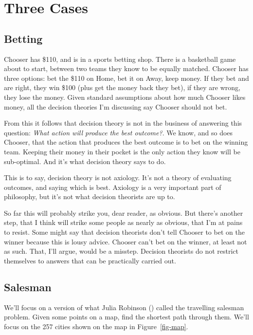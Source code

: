 \documentclass[
  11pt,
  letterpaper,
  DIV=11,
  numbers=noendperiod,
  oneside]{scrartcl}
\begin{document}
\section{Three Cases}\label{three-cases}

\subsection{Betting}\label{betting}

Chooser has \$110, and is in a sports betting shop. There is a
basketball game about to start, between two teams they know to be
equally matched. Chooser has three options: bet the \$110 on Home, bet
it on Away, keep money. If they bet and are right, they win \$100 (plus
get the money back they bet), if they are wrong, they lose the money.
Given standard assumptions about how much Chooser likes money, all the
decision theories I'm discussing say Chooser should not bet.

From this it follows that decision theory is not in the business of
answering this question: \emph{What action will produce the best
outcome?}. We know, and so does Chooser, that the action that produces
the best outcome is to bet on the winning team. Keeping their money in
their pocket is the only action they know will be sub-optimal. And it's
what decision theory says to do.

This is to say, decision theory is not axiology. It's not a theory of
evaluating outcomes, and saying which is best. Axiology is a very
important part of philosophy, but it's not what decision theorists are
up to.

So far this will probably strike you, dear reader, as obvious. But
there's another step, that I think will strike some people as nearly as
obvious, that I'm at pains to resist. Some might say that decision
theorists don't tell Chooser to bet on the winner because this is lousy
advice. Chooser can't bet on the winner, at least not as such. That,
I'll argue, would be a misstep. Decision theorists do not restrict
themselves to answers that can be practically carried out.

\subsection{Salesman}\label{salesman}

We'll focus on a version of what Julia Robinson
() called the travelling salesman
problem. Given some points on a map, find the shortest path through
them. We'll focus on the 257 cities shown on the map in
Figure~\ref{fig-map}.
\end{document}
